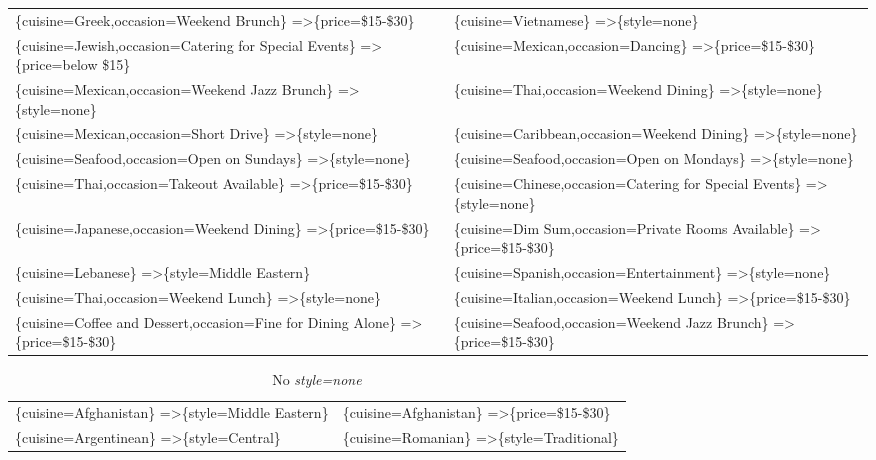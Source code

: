 \documentclass[letterpaper,10pt]{article}
\begin{document}
\begin{appendices}
\begin{table}[h]
\begin{adjustbox}{max width=\textwidth}
\begin{tabular}{ll}
\{cuisine=Greek,occasion=Weekend Brunch\} =\textgreater \{price=\$15-\$30\} & \{cuisine=Vietnamese\} =\textgreater \{style=none\} \\ 
\{cuisine=Jewish,occasion=Catering for Special Events\} =\textgreater \{price=below \$15\} & \{cuisine=Mexican,occasion=Dancing\} =\textgreater \{price=\$15-\$30\} \\ 
\{cuisine=Mexican,occasion=Weekend Jazz Brunch\} =\textgreater \{style=none\} & \{cuisine=Thai,occasion=Weekend Dining\} =\textgreater \{style=none\} \\ 
\{cuisine=Mexican,occasion=Short Drive\} =\textgreater \{style=none\} & \{cuisine=Caribbean,occasion=Weekend Dining\} =\textgreater \{style=none\} \\ 
\{cuisine=Seafood,occasion=Open on Sundays\} =\textgreater \{style=none\} & \{cuisine=Seafood,occasion=Open on Mondays\} =\textgreater \{style=none\} \\ 
\{cuisine=Thai,occasion=Takeout Available\} =\textgreater \{price=\$15-\$30\} & \{cuisine=Chinese,occasion=Catering for Special Events\} =\textgreater \{style=none\} \\ 
\{cuisine=Japanese,occasion=Weekend Dining\} =\textgreater \{price=\$15-\$30\} & \{cuisine=Dim Sum,occasion=Private Rooms Available\} =\textgreater \{price=\$15-\$30\} \\ 
\{cuisine=Lebanese\} =\textgreater \{style=Middle Eastern\} & \{cuisine=Spanish,occasion=Entertainment\} =\textgreater \{style=none\} \\ 
\{cuisine=Thai,occasion=Weekend Lunch\} =\textgreater \{style=none\} & \{cuisine=Italian,occasion=Weekend Lunch\} =\textgreater \{price=\$15-\$30\} \\ 
\{cuisine=Coffee and Dessert,occasion=Fine for Dining Alone\} =\textgreater \{price=\$15-\$30\} & \{cuisine=Seafood,occasion=Weekend Jazz Brunch\} =\textgreater \{price=\$15-\$30\} \\ 
\end{tabular}
\end{adjustbox}
\end{table}
\begin{table}[h]
\caption*{No \textit{style=none}}
\begin{adjustbox}{max width=\textwidth}
\begin{tabular}{ll}
\{cuisine=Afghanistan\} =\textgreater \{style=Middle Eastern\} & \{cuisine=Afghanistan\} =\textgreater \{price=\$15-\$30\} \\ 
\{cuisine=Argentinean\} =\textgreater \{style=Central\} & \{cuisine=Romanian\} =\textgreater \{style=Traditional\} \\ 

\end{tabular}
\end{adjustbox}
\end{table}
\end{appendices}
\end{document}
